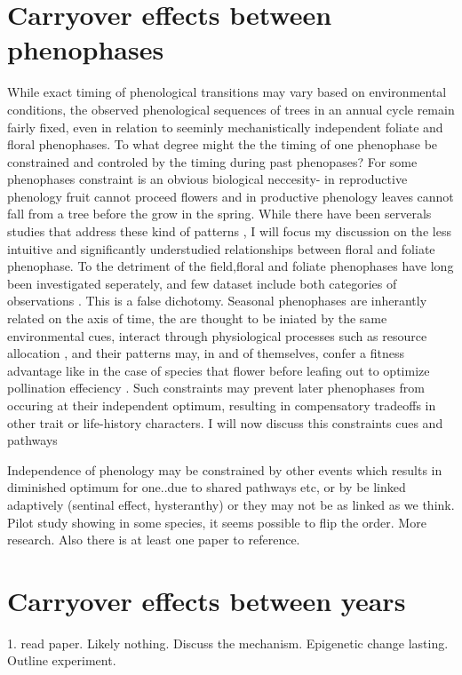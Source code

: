 \documentclass{article}\usepackage[]{graphicx}\usepackage[]{color}
\begin{document}
\section{Carryover effects between phenophases}
While exact timing of phenological transitions may vary based on environmental conditions, the observed phenological sequences of trees in an annual cycle remain fairly fixed, even in relation to seeminly mechanistically independent foliate and floral phenophases. To what degree might the the timing of one phenophase be constrained and controled by the timing during past phenopases? For some phenophases constraint is an obvious biological neccesity- in reproductive phenology fruit cannot proceed flowers and in productive phenology leaves cannot fall from a tree before the grow in the spring. While there have been serverals studies that address these kind of patterns \citep{Richardson something, Primack something}, I will focus my discussion on the less intuitive and significantly understudied relationships between floral and foliate phenophase.
To the detriment of the field,floral and foliate phenophases have long been investigated seperately, and few dataset include both categories of observations \citep{Wolkovich and Ettinger}. This is a false dichotomy. Seasonal phenophases are inherantly related on the axis of time, the are thought to be iniated by the same environmental cues, interact through physiological processes such as resource allocation \cite{}, and their patterns may, in and of themselves, confer a fitness advantage like in the case of species that flower before leafing out to optimize pollination effeciency \citep{}. Such constraints may prevent later phenophases from occuring at their independent optimum, resulting in compensatory tradeoffs in other trait or life-history characters.
I will now discuss this constraints
cues and pathways


 Independence of phenology may be constrained by other events which results in diminished optimum for one..due to shared pathways etc, or by be linked adaptively (sentinal effect, hysteranthy) or they may not be as linked as we think. Pilot study showing in some species, it seems possible to flip the order. More research. Also there is at least one paper to reference.
\section{Carryover effects between years}
1. read paper. Likely nothing. Discuss the mechanism. Epigenetic change lasting. Outline experiment.






\end{document}
